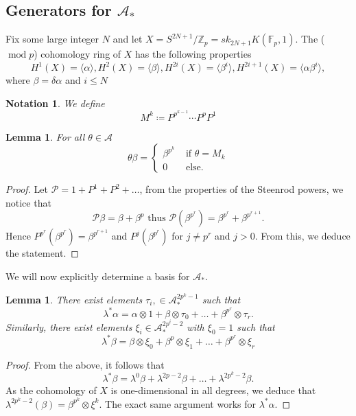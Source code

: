\documentclass[11pt, a4paper]{article}
\DeclareMathOperator*{\cmod}{mod}
\newtheorem{notn}[thm]{Notation}
\newtheorem{lemma}[thm]{Lemma}
\theoremstyle{plain}
\newtheorem*{proof}{Proof}
\begin{document}
\subsection{Generators for $\mathcal{A}_\ast$}
Fix some large integer $N$ and let $X = S^{2N+1} / \mathbb{Z}_p = sk_{2N+1} K( \mathbb{F}_p,1) $. The ($\cmod p$)  cohomology ring of $X$ has the following properties
\[ 
H^{1}( X) = \langle \alpha \rangle, H^{2}( X) = \langle \beta \rangle, H^{2i}( X) = \langle \beta^{i}\rangle, H^{2i+1}( X) = \langle \alpha\beta^{i}\rangle,
\]
where $\beta= \delta \alpha$ and $i \leq N$ \\
\begin{notn}
We define
\[ 
M^{k} \coloneq P^{p^{k-1}}\cdots P^{p}P^{1}
\]
\end{notn}
\begin{lemma}
	For all $\theta \in \mathcal{A}$
\[ 
\theta \beta =
\begin{cases}
	\beta^{p^{k}} &\text{ if } \theta = M_k\\
	0 & \text{ else. } 
\end{cases}
\]
\end{lemma}
\begin{proof}
Let $\mathcal{P}= 1+ P^{1}+ P^{2}+ \ldots$, from the properties of the Steenrod powers, we notice that
\[ 
\mathcal{P}\beta = \beta+ \beta^{p} \text{ thus } \mathcal{P}\left( \beta^{p^{r}}\right) = \beta^{p^{r}}+ \beta^{p^{r+1}}.
\]
Hence $P^{p^{r}}( \beta^{p^{r}}) = \beta^{p^{r+1}}$ and $P^{j}( \beta^{p^{r}}) $ for $j\neq p^{r}$ and $j>0$.
From this, we deduce the statement.
\end{proof}
We will now explicitly determine a basis for $\mathcal{A}_\ast$.
\begin{lemma}
There exist elements $\tau_i,\in \mathcal{A}_\ast^{2p^{k}-1}$ such that
\[ 
\lambda^{\ast}\alpha = \alpha\otimes 1 + \beta \otimes \tau_0 + \ldots + \beta^{p^{r}}\otimes\tau_r.
\]
Similarly, there exist elements $\xi_i \in  \mathcal{A}_\ast^{2p^{i}-2}$ with $\xi_0=1$ such that
\[ 
\lambda^{\ast}\beta = \beta\otimes \xi_0 + \beta^{p}\otimes \xi_1+ \ldots  +\beta^{p^{r}}\otimes \xi_r
\]

\end{lemma}
\begin{proof}
From the above, it follows that
\[ 
\lambda^{\ast}\beta = \lambda^{0}\beta + \lambda^{2p-2}\beta+ \ldots + \lambda^{2p^{k}-2}\beta.
\]
As the cohomology of $X$ is one-dimensional in all degrees, we deduce that $\lambda^{2p^{k}-2}( \beta) = \beta^{p^{k}}\otimes \xi^{k}$. The exact same argument works for $\lambda^{\ast}\alpha$.
\end{proof}
\end{document}

